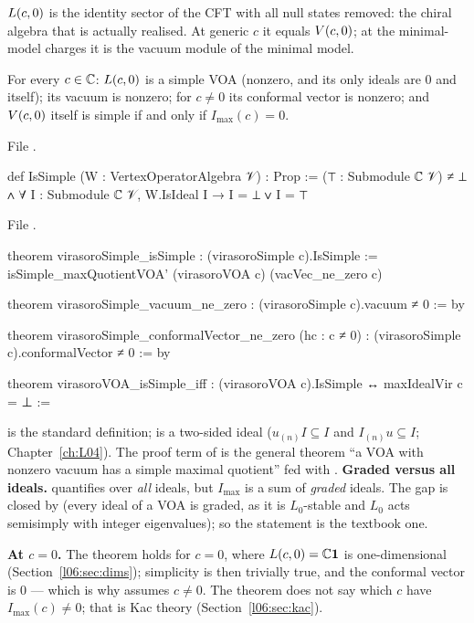 \begin{physics}
$L(c,0)$ is the identity sector of the CFT with all null states removed: the chiral algebra that is
actually realised. At generic $c$ it equals $V(c,0)$; at the minimal-model charges it is the vacuum
module of the minimal model.
\end{physics}

\begin{theorem}\label{l06:thm:simple}
For every $c\in{\mathbb{C}}$: $L(c,0)$ is a simple VOA (nonzero, and its only ideals are $0$ and itself); its
vacuum is nonzero; for $c\ne0$ its conformal vector is nonzero; and $V(c,0)$ itself is simple if and
only if $I_{\max}(c) = 0$.
\end{theorem}

File .
\begin{leancode}
def IsSimple (W : VertexOperatorAlgebra 𝒱) : Prop :=
  (⊤ : Submodule ℂ 𝒱) ≠ ⊥ ∧ ∀ I : Submodule ℂ 𝒱, W.IsIdeal I → I = ⊥ ∨ I = ⊤
\end{leancode}
File .
\begin{leancode}
theorem virasoroSimple_isSimple : (virasoroSimple c).IsSimple :=
  isSimple_maxQuotientVOA' (virasoroVOA c) (vacVec_ne_zero c)

theorem virasoroSimple_vacuum_ne_zero : (virasoroSimple c).vacuum ≠ 0 := by

theorem virasoroSimple_conformalVector_ne_zero (hc : c ≠ 0) :
    (virasoroSimple c).conformalVector ≠ 0 := by

theorem virasoroVOA_isSimple_iff : (virasoroVOA c).IsSimple ↔ maxIdealVir c = ⊥ :=
\end{leancode}

\begin{dictionary}
 is the standard definition;  is a two-sided ideal ($u_{(n)}I\subseteq I$
and $I_{(n)}u\subseteq I$; Chapter~\ref{ch:L04}). The proof term of \allowbreak{} is the
general theorem ``a VOA with nonzero vacuum has a simple maximal quotient'' fed with
. \textbf{Graded versus all ideals.}  quantifies over \emph{all}
ideals, but $I_{\max}$ is a sum of \emph{graded} ideals. The gap is closed by
\allowbreak{}\allowbreak{}\allowbreak{} (every ideal of a VOA is graded, as it is $L_0$-stable and $L_0$
acts semisimply with integer eigenvalues); so the statement is the textbook one.

\textbf{At $c = 0$.} The theorem holds for $c = 0$, where $L(c,0) = {\mathbb{C}}\mathbf{1}$ is one-dimensional
(Section~\ref{l06:sec:dims}); simplicity is then trivially true, and the conformal vector is $0$ --- which
is why \allowbreak{}\allowbreak{}\allowbreak{} assumes $c\ne0$. The theorem does not say which $c$
have $I_{\max}(c)\ne0$; that is Kac theory (Section~\ref{l06:sec:kac}).
\end{dictionary}

